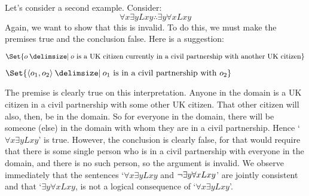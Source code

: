 Let's consider a second example. Consider:
	$$\forall x \exists y Lxy \therefore \exists y \forall x Lxy$$
Again, we want to show that this is invalid. To do this, we must make the premises true and the conclusion false. Here is a suggestion:
	\begin{interp}
		\item[\domain] $\Set{o \given o\text{ is a UK citizen currently in a civil partnership with another UK citizen}}$
		\item[\denote{L}] $\Set{\langle o_1,o_2\rangle \given  o_1\text{ is in a civil partnership with }o_2}$
	\end{interp}
The premise is clearly true on this interpretation. Anyone in the domain is a UK citizen in a civil partnership with some other UK citizen. That other citizen will also, then, be in the domain. So for everyone in the domain, there will be someone (else) in the domain with whom they are in a civil partnership. Hence `$\forall x \exists y Lxy$' is true. However, the conclusion is clearly false, for that would require that there is some single person who is in a civil partnership with everyone in the domain, and there is no such person, so the argument is invalid. We observe immediately that the sentences `$\forall x \exists y Lxy$ and $\neg\exists y \forall x Lxy$' are jointly consistent and that `$\exists y \forall x Lxy$, is not a logical consequence of `$\forall x \exists y Lxy$'.

